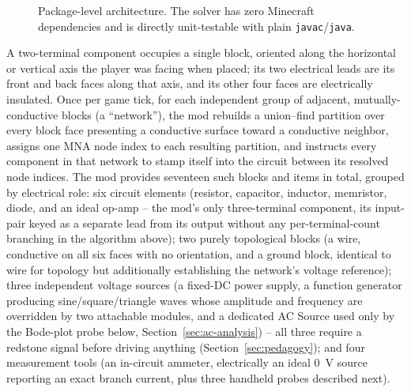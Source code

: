 \begin{figure}[htbp]
\caption{Package-level architecture. The solver has zero Minecraft dependencies and is
directly unit-testable with plain \texttt{javac}/\texttt{java}.}
\label{fig:architecture}
\end{figure}

A two-terminal component occupies a single block, oriented along the horizontal or vertical
axis the player was facing when placed; its two electrical leads are its front and back
faces along that axis, and its other four faces are electrically insulated. Once per game
tick, for each independent group of adjacent, mutually-conductive blocks (a ``network''), the
mod rebuilds a union--find partition over every block face presenting a conductive surface
toward a conductive neighbor, assigns one MNA node index to each resulting partition, and
instructs every component in that network to stamp itself into the circuit between its
resolved node indices. The mod provides seventeen such blocks and items in total, grouped by
electrical role: six circuit elements (resistor, capacitor, inductor, memristor, diode, and
an ideal op-amp -- the mod's only three-terminal component, its input-pair keyed as a
separate lead from its output without any per-terminal-count branching in the algorithm
above); two purely topological blocks (a wire, conductive on all six faces with no
orientation, and a ground block, identical to wire for topology but additionally
establishing the network's voltage reference); three independent voltage sources (a
fixed-DC power supply, a function generator producing sine/square/triangle waves whose
amplitude and frequency are overridden by two attachable modules, and a dedicated AC Source
used only by the Bode-plot probe below, Section~\ref{sec:ac-analysis}) -- all three require a
redstone signal before driving anything (Section~\ref{sec:pedagogy}); and four measurement
tools (an in-circuit ammeter, electrically an ideal 0~V source reporting an exact branch
current, plus three handheld probes described next).

